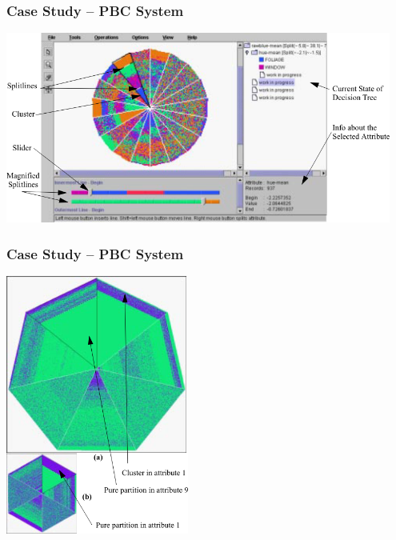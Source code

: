 \documentclass[xcolor=svgnames]{beamer}
\begin{document}
\begin{frame}
	\frametitle{Case Study -- PBC System}
	\begin{center}
		\includegraphics[width=0.95\textwidth]{img/pbc-screenshot.png}
	\end{center}
\end{frame}
\begin{frame}
	\frametitle{Case Study -- PBC System}
	\begin{center}
		\includegraphics[width=0.45\textwidth]{img/pbc-example.png}
	\end{center}
\end{frame}
\end{document}
